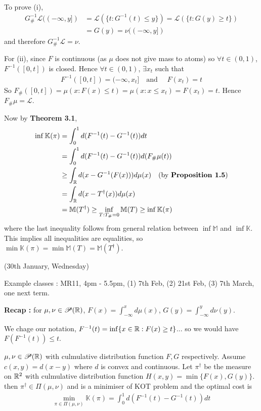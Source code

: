 \documentclass[12pt,a4paper]{article}
\newenvironment{proof}
{\begin{changemargin}{1cm}{0.5cm} 
	}%
	{\end{changemargin}
}
\newenvironment{p}
{\begin{proof} 
	}%
	{\end{proof}
}
\begin{document}
\begin{p}
\quad To prove (i),
\begin{align*}
G_{\#}^{-1} \mathscr{L} ((-\infty, y]) &= \mathscr{L} (\{t: G^{-1}(t) \leq y\}) = \mathscr{L} (\{t : G(y)\geq t\}) \\
&= G(y) = \nu ((-\infty, y])
\end{align*}
and therefore $G^{-1}_{\#} \mathscr{L}=\nu$.

\quad For (ii), since $F$ is continuous (as $\mu$ does not give mass to atoms) so $\forall t\in (0,1)$, $F^{-1}([0,t])$ is closed. Hence $\forall t\in (0,1)$, $\exists x_t$ such that
\begin{align*}
F^{-1}([0,t]) =(-\infty, x_t] \quad \text{and }\quad F(x_t) =t
\end{align*}
So $F_{\#}([0,t]) = \mu(x: F(x)\leq t) = \mu(x: x\leq x_t) = F(x_t) =t$. Hence $F_{\#}\mu = \mathscr{L}$.

\quad Now by \textbf{Theorem 3.1},
\begin{align*}
\inf \mathbb{K}(\pi) &= \int_0^1 d(F^{-1}(t)- G^{-1}(t)) dt\\
&= \int_0^1 d(F^{-1}(t) - G^{-1}(t)) d(F_{\#} \mu(t)) \\
&\geq \int_{\mathbb{R}} d(x- G^{-1}(F(x))) d\mu(x) \quad \text{(by \textbf{Proposition 1.5})} \\
&= \int_{\mathbb{R}} d(x- T^{\dagger}(x))d\mu(x) \\
&= \mathbb{M}(T^{\dagger}) \geq \inf_{T: T_{\#} =0} \mathbb{M}(T) \geq \inf \mathbb{K}(\pi)
\end{align*}
where the last inequality follows from general relation between $\inf \mathbb{M}$ and $\inf \mathbb{K}$. This implies all inequalities are equalities, so $\min \mathbb{K}(\pi) = \min \mathbb{M}(T) = \mathbb{M}(T^{\dagger})$.

\eop
\end{p}
\s

\newday

(30th January, Wednesday)
\s

Example classes : MR11, 4pm - 5.5pm, (1) 7th Feb, (2) 21st Feb, (3) 7th March, one next term.
\s

\textbf{Recap :} for $\mu, \nu \in \mathscr{P}(\mathbb{R})$, $F(x) = \int_{-\infty}^x d\mu(x)$, $G(y) = \int_{-\infty}^y d\nu(y)$.
\s

We chage our notation, $F^{-1}(t) = \inf \{x\in \mathbb{R} : F(x)\geq t \}$... so we would have $F(F^{-1}(t)) \leq t$.
\s

 $\mu, \nu \in \mathscr{P}(\mathbb{R})$ with culmulative distribution function $F, G$ respectively. Assume $c(x,y) = d(x-y)$ where $d$ is convex and continuous. Let $\pi^{\dagger}$ be the measure on $\mathbb{R}^2$ with culmulative distribution function $H(x,y) = \min \{F(x), G(y)\}$. then $\pi^{\dagger} \in \Pi(\mu, \nu)$ and is a minimiser of KOT problem and the optimal cost is
\begin{align*}
\min_{\pi \in \Pi(\mu, \nu)} \mathbb{K}(\pi) = \int_0^1 d(F^{-1}(t) - G^{-1}(t))dt
\end{align*}
\end{document}
